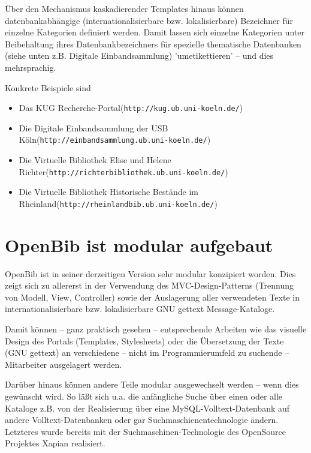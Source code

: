 \documentclass[11pt, twoside, a4paper, BCOR8mm, DIV12, bibtotoc,idxtotoc]{scrbook}
\begin{document}
Über den Mechanismus kaskadierender Templates hinaus können
datenbankabhängige (inter\-nationali\-sier\-bare bzw. lokalisierbare)
Bezeichner für einzelne Kategorien definiert werden. Damit lassen
sich einzelne Kategorien unter Beibehaltung ihres Datenbankbezeichners
für spezielle thematische Datenbanken (siehe unten z.B. Digitale
Einbandsammlung) 'umetikettieren' -- und dies mehrsprachig.

Konkrete Beispiele sind
\begin{itemize}
\item Das KUG Recherche-Portal\newline (\texttt{http://kug.ub.uni-koeln.de/})
\item Die Digitale Einbandsammlung der USB Köln\newline (\texttt{http://einbandsammlung.ub.uni-koeln.de/})
\item Die Virtuelle Bibliothek Elise und Helene Richter\newline (\texttt{http://richterbibliothek.ub.uni-koeln.de/})
\item Die Virtuelle Bibliothek Historische Bestände im Rheinland\newline (\texttt{http://rheinlandbib.ub.uni-koeln.de/})
\end{itemize}


\section{OpenBib ist modular aufgebaut}
OpenBib ist in seiner derzeitigen Version sehr modular konzipiert
worden. Dies zeigt sich zu allererst in der Verwendung des
MVC-Design-Patterns (Trennung von Modell, View, Controller) sowie der
Auslagerung aller verwendeten Texte in internationalisierbare bzw.
lokalisierbare GNU gettext Message-Kataloge.

Damit können -- ganz praktisch gesehen -- entsprechende Arbeiten wie
das visuelle Design des Portals (Templates, Stylesheets) oder die
Übersetzung der Texte (GNU gettext) an verschiedene -- nicht im
Programmierumfeld zu suchende -- Mitarbeiter ausgelagert werden.

Darüber hinaus können andere Teile modular ausgewechselt werden --
wenn dies gewünscht wird. So läßt sich u.a. die anfängliche Suche
über einen oder alle Kataloge z.B. von der Realisierung über eine
MySQL-Volltext-Datenbank auf andere Volltext-Datenbanken oder gar
Such\-ma\-schie\-nen\-tech\-no\-lo\-gie ändern. Letzteres wurde
bereits mit der Suchmaschinen-Technologie des OpenSource Projektes
Xapian realisiert. 
\end{document}
